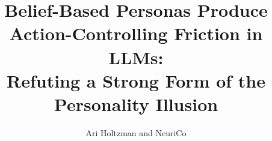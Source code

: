 \documentclass{article}
\title{Belief-Based Personas Produce Action-Controlling Friction in LLMs:\\ Refuting a Strong Form of the Personality Illusion}
\author{Ari Holtzman and NeuriCo}
\begin{document}
\maketitle

\begin{abstract}

\end{abstract}









\end{document}
